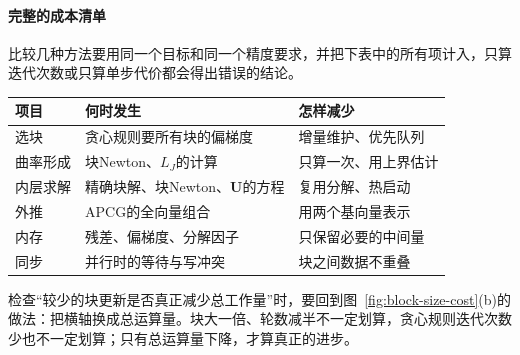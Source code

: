 \paragraph{完整的成本清单}
比较几种方法要用同一个目标和同一个精度要求，并把下表中的所有项计入，只算迭代次数或只算单步代价都会得出错误的结论。

\begin{BookInlineTable}
\centering
\begin{tabular}{p{14mm}p{42mm}p{36mm}}
\toprule
项目 & 何时发生 & 怎样减少\\
\midrule
选块 & 贪心规则要所有块的偏梯度 & 增量维护、优先队列\\
曲率形成 & 块Newton、$L_J$的计算 & 只算一次、用上界估计\\
内层求解 & 精确块解、块Newton、$\bm{U}$的方程 & 复用分解、热启动\\
外推 & APCG的全向量组合 & 用两个基向量表示\\
内存 & 残差、偏梯度、分解因子 & 只保留必要的中间量\\
同步 & 并行时的等待与写冲突 & 块之间数据不重叠\\
\bottomrule
\end{tabular}
\end{BookInlineTable}

检查“较少的块更新是否真正减少总工作量”时，要回到图~\ref{fig:block-size-cost}(b)的做法：把横轴换成总运算量。块大一倍、轮数减半不一定划算，贪心规则迭代次数少也不一定划算；只有总运算量下降，才算真正的进步。

